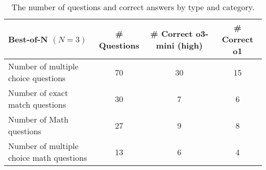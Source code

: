 \begin{table}[ht]
\small
  \centering
  \small
  \caption{The number of questions and correct answers by type and category.}
  \begin{tabular}{lccc}
    \toprule
     \textbf{Best-of-N $(N=3)$} & \textbf{\# Questions} & \textbf{\# Correct o3-mini (high)} & \textbf{\# Correct o1} \\ 
    \midrule
    Number of multiple choice questions    & 70 & 30 & 15 \\
    Number of exact match questions        & 30 & 7 &  6 \\
    Number of Math questions              & 27 & 9 &  8 \\
    Number of multiple choice math questions & 13 & 6 &  4 \\
    \bottomrule
  \end{tabular}
  \label{tab:questions_and_solves}
\end{table}
